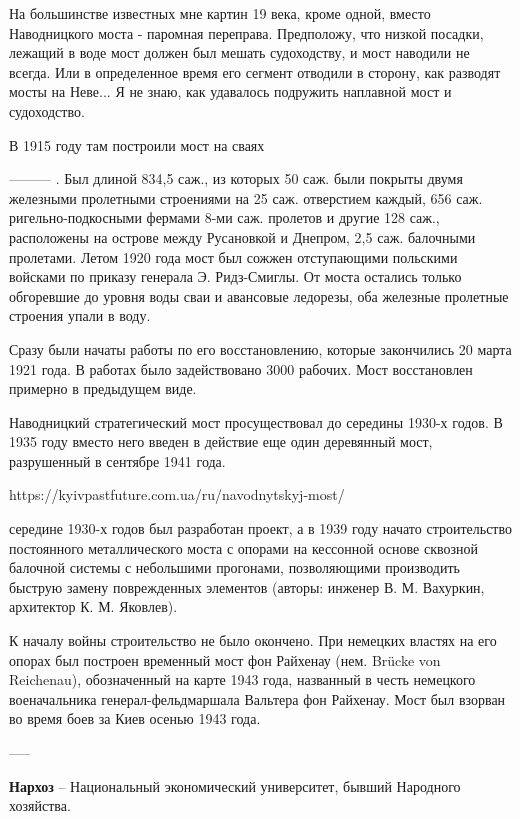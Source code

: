 На большинстве известных мне картин 19 века, кроме одной, вместо Наводницкого моста - паромная переправа. Предположу, что низкой посадки, лежащий в воде мост должен был мешать судоходству, и мост наводили не всегда. Или в определенное время его сегмент отводили в сторону, как разводят мосты на Неве... Я не знаю, как удавалось подружить наплавной мост и судоходство.



В 1915 году там построили мост на сваях

---------
. Был длиной 834,5 саж., из которых 50 саж. были покрыты двумя железными пролетными строениями на 25 саж. отверстием каждый, 656 саж. ригельно-подкосными фермами 8-ми саж. пролетов и другие 128 саж., расположены на острове между Русановкой и Днепром, 2,5 саж. балочными пролетами. Летом 1920 года мост был сожжен отступающими польскими войсками по приказу генерала Э. Ридз-Смиглы. От моста остались только обгоревшие до уровня воды сваи и авансовые ледорезы, оба железные пролетные строения упали в воду.

Сразу были начаты работы по его восстановлению, которые закончились 20 марта 1921 года. В работах было задействовано 3000 рабочих. Мост восстановлен примерно в предыдущем виде.


Наводницкий стратегический мост просуществовал до середины 1930-х годов. В 1935 году вместо него введен в действие еще один деревянный мост, разрушенный в сентябре 1941 года.


https://kyivpastfuture.com.ua/ru/navodnytskyj-most/

 середине 1930-х годов был разработан проект, а в 1939 году начато строительство постоянного металлического моста с опорами на кессонной основе сквозной балочной системы с небольшими прогонами, позволяющими производить быструю замену поврежденных элементов (авторы: инженер В. М. Вахуркин, архитектор К. М. Яковлев).

К началу войны строительство не было окончено. При немецких властях на его опорах был построен временный мост фон Райхенау (нем. Brücke von Reichenau), обозначенный на карте 1943 года, названный в честь немецкого военачальника генерал-фельдмаршала Вальтера фон Райхенау. Мост был взорван во время боев за Киев осенью 1943 года.



----- 

\textbf{Нархоз} – Национальный экономический университет, бывший Народного хозяйства.\\

